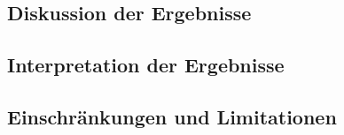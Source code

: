\subsection{Diskussion der Ergebnisse}

\subsection{Interpretation der Ergebnisse}

\subsection{Einschränkungen und Limitationen}

